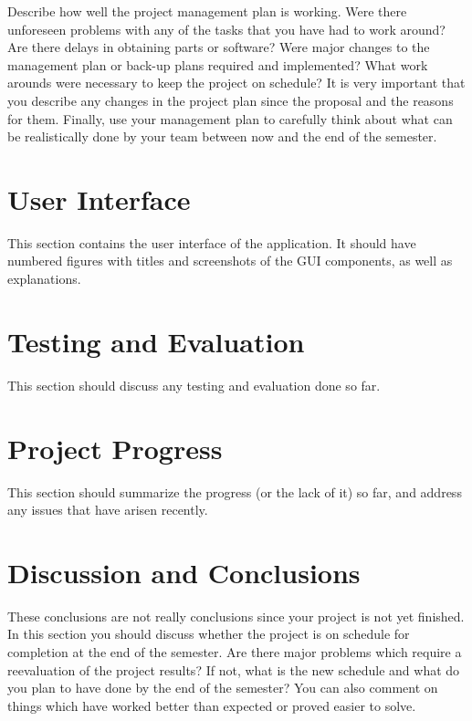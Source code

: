 \documentclass[letterpaper,12pt]{article}
\begin{document}
Describe how well the project management plan is working. Were there unforeseen
problems with any of the tasks that you have had to work around? Are there
delays in obtaining parts or software? Were major changes to the management plan
or back-up plans required and implemented? What work arounds were necessary to
keep the project on schedule? It is very important that you describe any changes
in the project plan since the proposal and the reasons for them.
Finally, use your management plan to carefully think about what can be
realistically done by your team between now and the end of the semester.
\newpage



\section{User Interface}
This section contains the user interface of the application. It should have
numbered figures with titles and screenshots of the GUI components, as well as
explanations.
\newpage



\section{Testing and Evaluation}
This section should discuss any testing and evaluation done so far.
\newpage



\section{Project Progress}
This section should summarize the progress (or the lack of it) so far, and
address any issues that have arisen recently.
\newpage



\section{Discussion and Conclusions}
These conclusions are not really conclusions since your project is not yet
finished. In this section you should discuss whether the project is on schedule
for completion at the end of the semester. Are there major problems which
require a reevaluation of the project results?  If not, what is the new schedule
and what do you plan to have done by the end of the semester?  You can also
comment on things which have worked better than expected or proved easier to
solve.
\newpage
\end{document}
